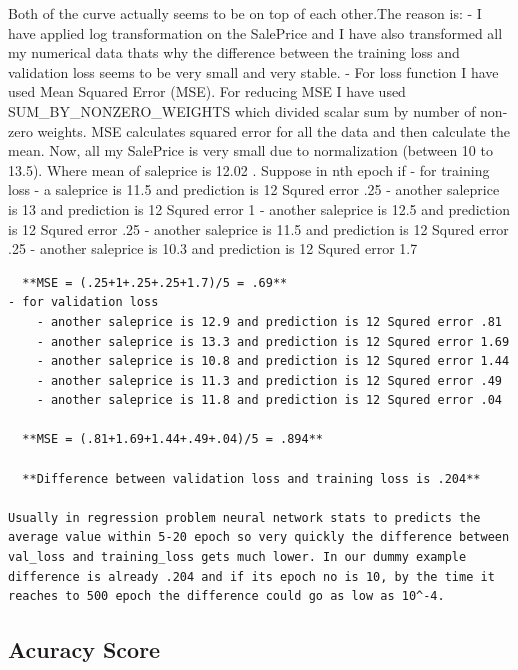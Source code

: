 \documentclass[11pt, a4paper , landscape]{article}
\begin{document}
    Both of the curve actually seems to be on top of each other.The reason
is: - I have applied log transformation on the SalePrice and I have also
transformed all my numerical data thats why the difference between the
training loss and validation loss seems to be very small and very
stable. - For loss function I have used Mean Squared Error (MSE). For
reducing MSE I have used SUM\_BY\_NONZERO\_WEIGHTS which divided scalar
sum by number of non-zero weights. MSE calculates squared error for all
the data and then calculate the mean. Now, all my SalePrice is very
small due to normalization (between 10 to 13.5). Where mean of saleprice
is 12.02 . Suppose in nth epoch if - for training loss - a saleprice is
11.5 and prediction is 12 Squred error .25 - another saleprice is 13 and
prediction is 12 Squred error 1 - another saleprice is 12.5 and
prediction is 12 Squred error .25 - another saleprice is 11.5 and
prediction is 12 Squred error .25 - another saleprice is 10.3 and
prediction is 12 Squred error 1.7

\begin{verbatim}
  **MSE = (.25+1+.25+.25+1.7)/5 = .69**
- for validation loss
    - another saleprice is 12.9 and prediction is 12 Squred error .81
    - another saleprice is 13.3 and prediction is 12 Squred error 1.69
    - another saleprice is 10.8 and prediction is 12 Squred error 1.44
    - another saleprice is 11.3 and prediction is 12 Squred error .49
    - another saleprice is 11.8 and prediction is 12 Squred error .04
    
  **MSE = (.81+1.69+1.44+.49+.04)/5 = .894**
  
  **Difference between validation loss and training loss is .204**
  
Usually in regression problem neural network stats to predicts the average value within 5-20 epoch so very quickly the difference between val_loss and training_loss gets much lower. In our dummy example difference is already .204 and if its epoch no is 10, by the time it reaches to 500 epoch the difference could go as low as 10^-4.
\end{verbatim}

    \subsection{Acuracy Score}\label{acuracy-score}
\end{document}
